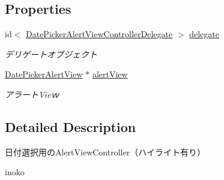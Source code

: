 \subsection*{Properties}
\begin{DoxyCompactItemize}
\item 
\hypertarget{interface_date_picker_alert_view_controller_a8e2e3f09909ad7beab26a59e01bfae4f}{
id$<$ \hyperlink{protocol_date_picker_alert_view_controller_delegate-p}{DatePickerAlertViewControllerDelegate} $>$ \hyperlink{interface_date_picker_alert_view_controller_a8e2e3f09909ad7beab26a59e01bfae4f}{delegate}}
\label{interface_date_picker_alert_view_controller_a8e2e3f09909ad7beab26a59e01bfae4f}

\begin{DoxyCompactList}\small\item\em デリゲートオブジェクト \end{DoxyCompactList}\item 
\hypertarget{interface_date_picker_alert_view_controller_a382f42716e884619ae1c8a70f60a98a9}{
\hyperlink{interface_date_picker_alert_view}{DatePickerAlertView} $\ast$ \hyperlink{interface_date_picker_alert_view_controller_a382f42716e884619ae1c8a70f60a98a9}{alertView}}
\label{interface_date_picker_alert_view_controller_a382f42716e884619ae1c8a70f60a98a9}

\begin{DoxyCompactList}\small\item\em アラートVieｗ \end{DoxyCompactList}\end{DoxyCompactItemize}


\subsection{Detailed Description}
日付選択用のAlertViewController（ハイライト有り）

inoko 

